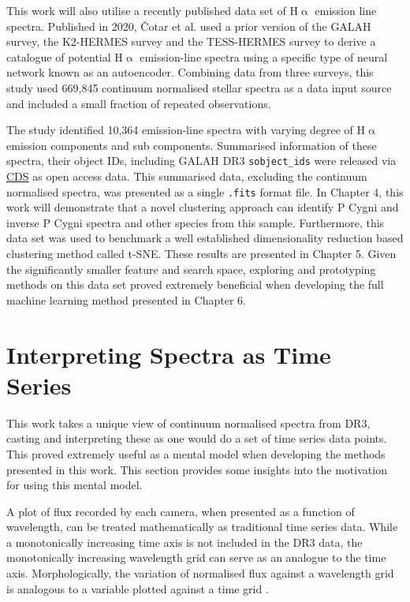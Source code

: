 This work will also utilise a recently published data set of H$\upalpha$ emission line spectra. Published in 2020, Čotar et al.\cite{vcotar2021galah} used a prior version of the GALAH survey\cite{de2015galah}, the K2-HERMES survey\cite{wittenmyer2018k2} and the TESS-HERMES survey\cite{sharma2018tess} to derive a catalogue of potential H$\upalpha$ emission-line spectra using a specific type of neural network known as an autoencoder. Combining data from three surveys, this study used 669,845 continuum normalised stellar spectra as a data input source and included a small fraction of repeated observations. 

The study identified 10,364 emission-line spectra with varying degree of H$\upalpha$ emission components and sub components. Summarised information of these spectra, their object IDs, including GALAH DR3 \texttt{sobject\_ids} were released via \href{https://cdsweb.u-strasbg.fr/}{CDS} as open access data. This summarised data, excluding the continuum normalised spectra, was presented as a single \texttt{.fits} format file. In Chapter 4, this work will demonstrate that a novel clustering approach can identify P Cygni and inverse P Cygni spectra and other species from this sample. Furthermore, this data set was used to benchmark a well established dimensionality reduction based clustering method called t-SNE. These results are presented in Chapter 5. Given the significantly smaller feature and search space, exploring and prototyping methods on this data set proved extremely beneficial when developing the full machine learning method presented in Chapter 6.

\section{Interpreting Spectra as Time Series}

This work takes a unique view of continuum normalised spectra from DR3, casting and interpreting these as one would do a set of time series data points. This proved extremely useful as a mental model when developing the methods presented in this work. This section provides some insights into the motivation for using this mental model. 

A plot of flux recorded by each camera, when presented as a function of wavelength, can be treated mathematically as traditional time series data. While a monotonically increasing time axis is not included in the DR3 data, the monotonically increasing wavelength grid can serve as an analogue to the time axis. Morphologically, the variation of normalised flux against a wavelength grid is analogous to a variable plotted against a time grid \cite{nielsen2019practical}.


